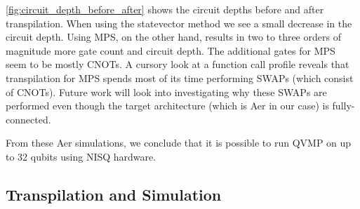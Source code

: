 \documentclass[11pt]{article}
\theoremstyle{definition}
\theoremstyle{remark}
\begin{document}
\cref{fig:circuit_depth_before_after} shows the circuit depths before and after
transpilation. When using the statevector method we see a small decrease in the
circuit depth. Using MPS, on the other hand, results in two to three orders of
magnitude more gate count and circuit depth. The additional gates for MPS seem
to be mostly CNOTs. A cursory look at a function call profile reveals that
transpilation for MPS spends most of its time performing SWAPs (which consist of
CNOTs). Future work will look into investigating why these SWAPs are performed
even though the target architecture (which is Aer in our case) is
fully-connected.

From these Aer simulations, we conclude that it is possible to run QVMP on up to
32 qubits using NISQ hardware.

\subsection{Transpilation and Simulation}
\end{document}
